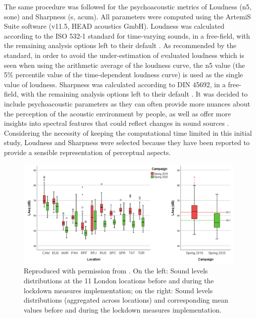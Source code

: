  The same procedure was followed for the psychoacoustic metrics of Loudness (\gls{n5}, sone) and Sharpness (\gls{s}, acum). All parameters were computed using the ArtemiS Suite software (v11.5, HEAD acoustics GmbH). Loudness was calculated according to the ISO 532-1 standard for time-varying sounds, in a free-field, with the remaining analysis options left to their default \citep{ISO532Part1}. As recommended by the standard, in order to avoid the under-estimation of evaluated loudness which is seen when using the arithmetic average of the loudness curve, the \gls{n5} value (the 5\% percentile value of the time-dependent loudness curve) is used as the single value of loudness. Sharpness was calculated according to DIN 45692, in a free-field, with the remaining analysis options left to their default . It was decided to include psychoacoustic parameters as they can often provide more nuances about the perception of the acoustic environment by people, as well as offer more insights into spectral features that could reflect changes in sound sources . Considering the necessity of keeping the computational time limited in this initial study, Loudness and Sharpness were selected because they have been reported to provide a sensible representation of perceptual aspects. 

 \begin{figure}
   \caption{Reproduced with permission from \citet{Aletta2020Assessing}. On the left: Sound levels distributions at the 11 London locations before and during the lockdown measures implementation; on the right: Sound levels distributions (aggregated across locations) and corresponding mean values before and during the lockdown measures implementation. \label{fig:NsMapLockLAeq}}
   \centering
   \includegraphics[width=\textwidth]{Figures/NoiseMappingLockdown Fig 1.png} 
  \end{figure}

